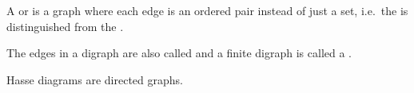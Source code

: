 \begin{definition}
A  or  is a graph where each edge is an ordered pair instead of just a set, i.e.\ the  is distinguished from the .

The edges in a digraph are also called  and a finite digraph is called a .
\end{definition}
\begin{example}
Hasse diagrams are directed graphs.
\end{example}